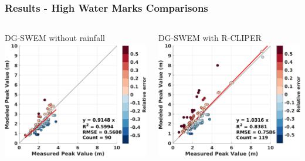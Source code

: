 \documentclass[10pt]{oden_beamer}
\begin{document}
\begin{frame}
  \frametitle{Results - High Water Marks Comparisons}
  \begin{columns}
    \centering
    \vspace{0.5cm}
    \centering
    DG-SWEM without rainfall
    \includegraphics[width=\linewidth]{2008_norain.jpg}

    \centering
    \vspace{0.5cm}
    \centering
    DG-SWEM with R-CLIPER
    \includegraphics[width=\linewidth]{2008_rain.jpg}

  \end{columns}
\end{frame}
\end{document}
